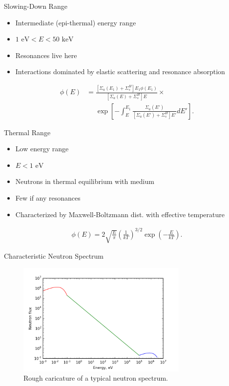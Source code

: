 \documentclass[presentation]{beamer}
\begin{document}
\begin{frame}[label={sec:orgheadline7}]{Slowing-Down Range}
\begin{itemize}
\item Intermediate (epi-thermal) energy range
\item \(1 \text{ eV} < E < 50 \text{ keV}\)
\item Resonances live here
\item Interactions dominated by elastic scattering and resonance absorption
\end{itemize}
\begin{align*}
  \phi(E) &= \frac{\left[ \Sigma_a(E_1) + \Sigma_s^H \right] E_1 \phi(E_1)}{\left[ \Sigma_a(E) + \Sigma_s^H \right] E} \times \\
          &\phantom{=}  \exp\left[ -\int_E^{E_1} \frac{\Sigma_a(E')}{\left[ \Sigma_a(E') + \Sigma_s^H \right] E'} dE' \right].
\end{align*}
\end{frame}
\begin{frame}[label={sec:orgheadline8}]{Thermal Range}
\begin{itemize}
\item Low energy range
\item \(E < 1 \text{ eV}\)
\item Neutrons in thermal equilibrium with medium
\item Few if any resonances
\item Characterized by Maxwell-Boltzmann dist. with effective temperature
\end{itemize}
\begin{align*}
  \phi(E) = 2 \sqrt{\frac{E}{\pi}} \left( \frac{1}{kT} \right)^{3/2} \exp\left( - \frac{E}{kT} \right).
\end{align*}
\end{frame}
\begin{frame}[label={sec:orgheadline9}]{Characteristic Neutron Spectrum}
\begin{figure}
  \centering
  \includegraphics[width=0.75\textwidth]{../notebooks/spectrumcartoon.png}
  \caption{Rough caricature of a typical neutron spectrum.}
  \label{fig::spectrum}
\end{figure}
\end{frame}
\end{document}
